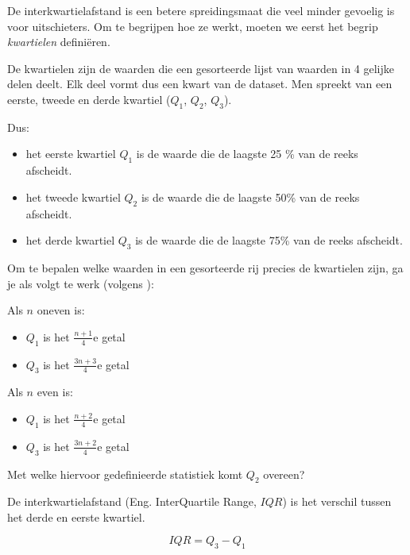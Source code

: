 De interkwartielafstand is een betere spreidingsmaat die veel minder gevoelig is voor uitschieters. Om te begrijpen hoe ze werkt, moeten we eerst het begrip \emph{kwartielen} definiëren.

\begin{definition}[Kwartielen]
  De  kwartielen zijn de waarden die een gesorteerde lijst van waarden in 4 gelijke delen deelt. Elk deel vormt dus een kwart van de dataset. Men spreekt van een eerste, tweede en derde kwartiel ($Q_{1}$, $Q_{2}$, $Q_{3}$).
\end{definition}

Dus:

\begin{itemize}
  \item het eerste kwartiel $Q_{1}$ is de waarde die de laagste 25 \% van de reeks afscheidt.
  \item het tweede kwartiel $Q_{2}$ is de waarde die de laagste 50\% van de reeks afscheidt.
  \item het derde kwartiel $Q_{3}$ is de waarde die de laagste 75\% van de reeks afscheidt.
\end{itemize}

Om te bepalen welke waarden in een gesorteerde rij precies de kwartielen zijn, ga je als volgt te werk (volgens \textcite{Moore2002}):

Als $n$ oneven is:

\begin{itemize}
  \item $Q_{1}$ is het $\frac{n+1}{4}$e getal
  \item $Q_{3}$ is het $\frac{3n+3}{4}$e getal
\end{itemize}

Als $n$ even is:

\begin{itemize}
  \item $Q_{1}$ is het $\frac{n+2}{4}$e getal
  \item $Q_{3}$ is het $\frac{3n+2}{4}$e getal
\end{itemize}

\begin{exercise}
  Met welke hiervoor gedefinieerde statistiek komt $Q_{2}$ overeen?
\end{exercise}

\begin{definition}[Interkwartielafstand]
  De interkwartielafstand (Eng. InterQuartile Range, $IQR$) is het verschil tussen het derde en eerste kwartiel.
  
  \begin{equation}
    IQR = Q_3 - Q_1
  \end{equation}
\end{definition}

